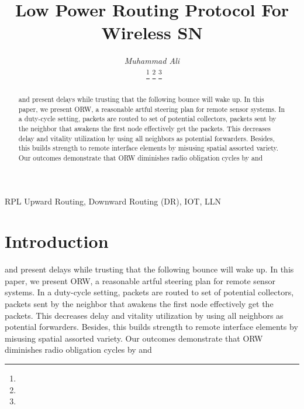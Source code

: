 \documentclass[12pt,journal,comsoc, letterpaper, twocolumn]{IEEEtran}
\begin{document}
\title{Low Power Routing Protocol For Wireless SN } 
 
 \author{\textit{{\small Muhammad Ali }}       
 
  \textit{{\small }}        
\
\thanks{}
\thanks{}
\thanks{}}
\maketitle


\begin{abstract}
and present delays while trusting that the following bounce will wake up. In this paper,  we present ORW, a reasonable artful steering plan for remote sensor systems. In a duty-cycle setting, packets are routed to set of potential collectors, packets sent by the neighbor that awakens the first node effectively get the packets. This decreases delay and vitality utilization by using all neighbors as potential forwarders. Besides, this builds strength to remote interface elements by misusing spatial assorted variety. Our outcomes demonstrate that ORW diminishes radio obligation cycles by and 



\end{abstract}


\begin{IEEEkeywords}
RPL Upward Routing, Downward Routing (DR), IOT, LLN
\end{IEEEkeywords}










\section{Introduction}


and present delays while trusting that the following bounce will wake up. In this paper,  we present ORW, a reasonable artful steering plan for remote sensor systems. In a duty-cycle setting, packets are routed to set of potential collectors, packets sent by the neighbor that awakens the first node effectively get the packets. This decreases delay and vitality utilization by using all neighbors as potential forwarders. Besides, this builds strength to remote interface elements by misusing spatial assorted variety. Our outcomes demonstrate that ORW diminishes radio obligation cycles by and 
\end{document}
